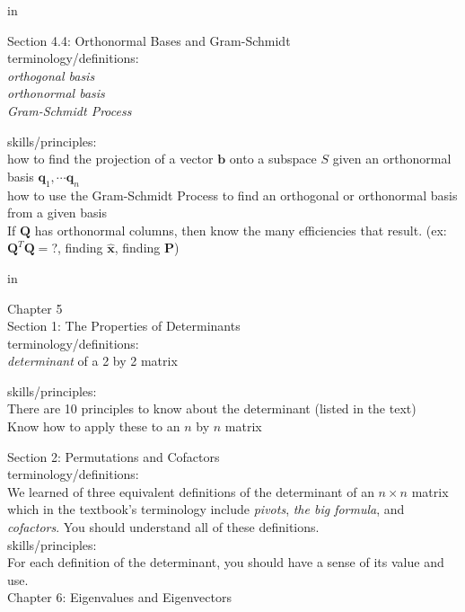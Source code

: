 \documentclass[11pt,fleqn]{article}
\newcommand{\bQ}{\mathbf{Q}}
\newcommand{\bP}{\mathbf{P}}
\newcommand{\bb}{\mathbf{b}}
\newcommand{\bx}{\mathbf{x}}
\newcommand{\bq}{\mathbf{q}}
\begin{document}
 in

\noindent Section 4.4: Orthonormal Bases and Gram-Schmidt\\


terminology/definitions: \\
\emph{orthogonal basis}\\
\emph{orthonormal basis}\\
\emph{Gram-Schmidt Process}

skills/principles: \\
how to find the projection of a vector $\bb$ onto a subspace $S$ given an orthonormal basis $\bq_1, \cdots \bq_n$\\
how to use the Gram-Schmidt Process to find an orthogonal or orthonormal basis from a given basis\\
If $\bQ$ has orthonormal columns, then know the many efficiencies that result. (ex: $\bQ^T\bQ=$?, finding $\widehat{\bx}$, finding $\bP$)

 in

\noindent Chapter 5 \\

\noindent Section 1: The Properties of Determinants\\

terminology/definitions: \\
\emph{determinant} of a 2 by 2 matrix

skills/principles: \\
There are 10 principles to know about the determinant (listed in the text)\\
Know how to apply these to an $n$ by $n$ matrix

\noindent Section 2: Permutations and Cofactors\\

terminology/definitions:\\
We learned of three equivalent definitions of the determinant of an $n \times n$ matrix which in the textbook's terminology include \emph{pivots}, \emph{the big formula}, and \emph{cofactors}.  You should understand all of these definitions.\\

skills/principles: \\
For each definition of the determinant, you should have a sense of its value and use.\\

\noindent Chapter 6: Eigenvalues and Eigenvectors\\
\end{document}
